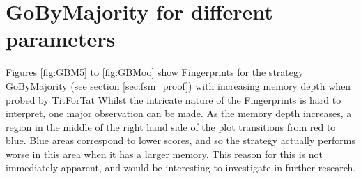 \section{GoByMajority for different parameters}\label{sec:GBM}

Figures \ref{fig:GBM5} to \ref{fig:GBMoo} show Fingerprints for the strategy GoByMajority (see section \ref{sec:fsm_proof}) with increasing memory depth when probed by TitForTat
Whilst the intricate nature of the Fingerprints is hard to interpret, one major observation can be made.
As the memory depth increases, a region in the middle of the right hand side of the plot transitions from red to blue.
Blue areas correspond to lower scores, and so the strategy actually performs worse in this area when it has a larger memory.
This reason for this is not immediately apparent, and would be interesting to investigate in further research.

